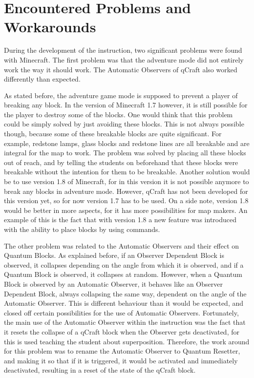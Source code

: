 \documentclass[11pt,twoside]{report} %
\begin{document}
\section{Encountered Problems and Workarounds}

During the development of the instruction, two significant problems were found with Minecraft. The first problem was that the adventure mode did not entirely work the way it should work. The Automatic Observers of qCraft also worked differently than expected.

As stated before, the adventure game mode is supposed to prevent a player of breaking any block. In the version of Minecraft 1.7 however, it is still possible for the player to destroy some of the blocks. One would think that this problem could be simply solved by just avoiding these blocks. This is not always possible though, because some of these breakable blocks are quite significant. For example, redstone lamps, glass blocks and redstone lines are all breakable and are integral for the map to work. The problem was solved by placing all these blocks out of reach, and by telling the students on beforehand that these blocks were breakable without the intention for them to be breakable. Another solution would be to use version 1.8 of Minecraft, for in this version it is not possible anymore to break any blocks in adventure mode. However, qCraft has not been developed for this version yet, so for now version 1.7 has to be used. On a side note, version 1.8 would be better in more aspects, for it has more possibilities for map makers. An example of this is the fact that with version 1.8 a new feature was introduced with the ability to place blocks by using commands.

The other problem was related to the Automatic Observers and their effect on Quantum Blocks. As explained before, if an Observer Dependent Block is observed, it collapses depending on the angle from which it is observed, and if a Quantum Block is observed, it collapses at random. However, when a Quantum Block is observed by an Automatic Observer, it behaves like an Observer Dependent Block, always collapsing the same way, dependent on the angle of the Automatic Observer. This is different behaviour than it would be expected, and closed off certain possibilities for the use of Automatic Observers. Fortunately, the main use of the Automatic Observer within the instruction was the fact that it resets the collapse of a qCraft block when the Observer gets deactivated, for this is used teaching the student about superposition. Therefore, the work around for this problem was to rename the Automatic Observer to Quantum Resetter, and making it so that if it is triggered, it would be activated and immediately deactivated, resulting in a reset of the state of the qCraft block.
\end{document}
